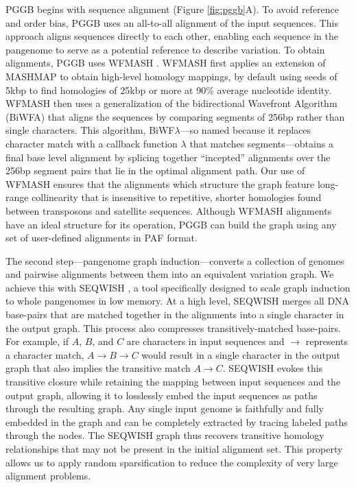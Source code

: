 \documentclass[pdflatex,mathphys]{jnl}%
\theoremstyle{thmstyleone}%
\theoremstyle{thmstyletwo}%
\theoremstyle{thmstylethree}%
\begin{document}
PGGB begins with sequence alignment (Figure \ref{fig:pggb}A).
To avoid reference and order bias, PGGB uses an all-to-all alignment of the input sequences.
This approach aligns sequences directly to each other, enabling each sequence in the pangenome to serve as a potential reference to describe variation.
To obtain alignments, PGGB uses WFMASH \cite{Guarracino_wfmash_2021}.
WFMASH first applies an extension of MASHMAP \cite{Jain_2018} to obtain high-level homology mappings, by default using seeds of 5kbp to find homologies of 25kbp or more at 90\% average nucleotide identity.
WFMASH then uses a generalization of the bidirectional Wavefront Algorithm (BiWFA) \cite{Marco_Sola_2020,Marco_Sola_2023} that aligns the sequences by comparing segments of 256bp rather than single characters.
This algorithm, BiWF$\lambda$---so named because it replaces character match with a callback function $\lambda$ that matches segments---obtains a final base level alignment by splicing together ``incepted'' alignments over the 256bp segment pairs that lie in the optimal alignment path.
Our use of WFMASH ensures that the alignments which structure the graph feature long-range collinearity that is insensitive to repetitive, shorter homologies found between transposons and satellite sequences.
Although WFMASH alignments have an ideal structure for its operation, PGGB can build the graph using any set of user-defined alignments in PAF format.

The second step---pangenome graph induction---converts a collection of genomes and pairwise alignments between them into an equivalent variation graph.
We achieve this with SEQWISH \cite{Garrison_seqwish_2022}, a tool specifically designed to scale graph induction to whole pangenomes in low memory.
At a high level, SEQWISH merges all DNA base-pairs that are matched together in the alignments into a single character in the output graph.
This process also compresses transitively-matched base-pairs.
For example, if $A$, $B$, and $C$ are characters in input sequences and $\to$ represents a character match, $A \to B \to C$ would result in a single character in the output graph that also implies the transitive match $A \to C$.
SEQWISH evokes this transitive closure while retaining the mapping between input sequences and the output graph, allowing it to losslessly embed the input sequences as paths through the resulting graph.
Any single input genome is faithfully and fully embedded in the graph and can be completely extracted by tracing labeled paths through the nodes.
The SEQWISH graph thus recovers transitive homology relationships that may not be present in the initial alignment set.
This property allows us to apply random sparsification to reduce the complexity of very large alignment problems.
\end{document}
